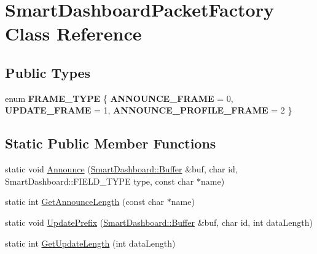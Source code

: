 \hypertarget{classSmartDashboardPacketFactory}{\section{\-Smart\-Dashboard\-Packet\-Factory \-Class \-Reference}
\label{classSmartDashboardPacketFactory}
}
\subsection*{\-Public \-Types}
\begin{DoxyCompactItemize}
\item 
enum {\bfseries \-F\-R\-A\-M\-E\-\_\-\-T\-Y\-P\-E} \{ {\bfseries \-A\-N\-N\-O\-U\-N\-C\-E\-\_\-\-F\-R\-A\-M\-E} =  0, 
{\bfseries \-U\-P\-D\-A\-T\-E\-\_\-\-F\-R\-A\-M\-E} =  1, 
{\bfseries \-A\-N\-N\-O\-U\-N\-C\-E\-\_\-\-P\-R\-O\-F\-I\-L\-E\-\_\-\-F\-R\-A\-M\-E} =  2
 \}
\end{DoxyCompactItemize}
\subsection*{\-Static \-Public \-Member \-Functions}
\begin{DoxyCompactItemize}
\item 
static void \hyperlink{classSmartDashboardPacketFactory_aad9ceb5e7e64f262a58ee5acfcce9703}{\-Announce} (\hyperlink{classSmartDashboard_1_1Buffer}{\-Smart\-Dashboard\-::\-Buffer} \&buf, char id, \-Smart\-Dashboard\-::\-F\-I\-E\-L\-D\-\_\-\-T\-Y\-P\-E type, const char $\ast$name)
\item 
static int \hyperlink{classSmartDashboardPacketFactory_a0eca571b4913ecdc7d6a000fef14b4a1}{\-Get\-Announce\-Length} (const char $\ast$name)
\item 
static void \hyperlink{classSmartDashboardPacketFactory_a7b4c5bef57b3758cda7e4dc425b992ee}{\-Update\-Prefix} (\hyperlink{classSmartDashboard_1_1Buffer}{\-Smart\-Dashboard\-::\-Buffer} \&buf, char id, int data\-Length)
\item 
static int \hyperlink{classSmartDashboardPacketFactory_a8fa74623d0c6e59ade47b37956223ec2}{\-Get\-Update\-Length} (int data\-Length)
\end{DoxyCompactItemize}


